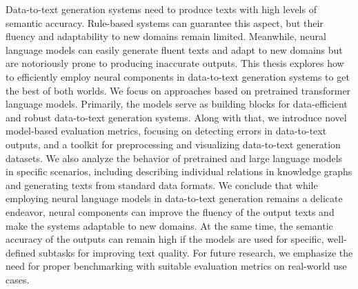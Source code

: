Data-to-text generation systems need to produce texts with high levels of semantic accuracy. Rule-based systems can guarantee this aspect, but their fluency and adaptability to new domains remain limited. Meanwhile, neural language models can easily generate fluent texts and adapt to new domains but are notoriously prone to producing inaccurate outputs. This thesis explores how to efficiently employ neural components in data-to-text generation systems to get the best of both worlds. We focus on approaches based on pretrained transformer language models. Primarily, the models serve as building blocks for data-efficient and robust data-to-text generation systems. Along with that, we introduce novel model-based evaluation metrics, focusing on detecting errors in data-to-text outputs, and a toolkit for preprocessing and visualizing data-to-text generation datasets. We also analyze the behavior of pretrained and large language models in specific scenarios, including describing individual relations in knowledge graphs and generating texts from standard data formats. We conclude that while employing neural language models in data-to-text generation remains a delicate endeavor, neural components can improve the fluency of the output texts and make the systems adaptable to new domains. At the same time, the semantic accuracy of the outputs can remain high if the models are used for specific, well-defined subtasks for improving text quality. For future research, we emphasize the need for proper benchmarking with suitable evaluation metrics on real-world use cases.